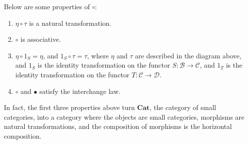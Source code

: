 \documentclass[12pt]{article}
\begin{document}
Below are some properties of $\circ$:
\begin{enumerate}
\item $\eta\circ \tau$ is a natural transformation.
\item $\circ$ is associative.
\item $\eta\circ 1_S=\eta$, and $1_S\circ \tau =\tau$, where $\eta$ and $\tau$ are described in the diagram above, and $1_S$ is the identity transformation on the functor $S:\mathcal{B}\to \mathcal{C}$, and $1_T$ is the identity transformation on the functor $T:\mathcal{C}\to \mathcal{D}$.
\item $\circ$ and $\bullet$ satisfy the interchange law.
\end{enumerate}

In fact, the first three properties above turn $\textbf{Cat}$, the category of small categories, into a category where the objects are small categories, morphisms are natural transformations, and the composition of morphisms is the horizontal composition.
\end{document}
